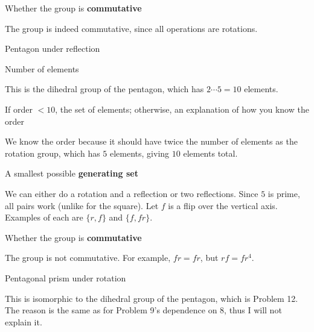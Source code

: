 \documentclass[../gatm_answers.tex]{subfiles}
\begin{document}
\begin{inner_problem}
\item Whether the group is \textbf{commutative}
\end{inner_problem}

The group is indeed commutative, since all operations are rotations.

\begin{outer_problem}
\item Pentagon under reflection
\end{outer_problem}

\begin{inner_problem}[start=1]
\item Number of elements
\end{inner_problem}

This is the dihedral group of the pentagon, which has $2\cdots 5=10$ elements.

\begin{inner_problem}
\item If order $< 10$, the set of elements; otherwise, an explanation of how you know the order
\end{inner_problem}

We know the order because it should have twice the number of elements as the rotation group, which has $5$ elements, giving $10$ elements total.

\begin{inner_problem}
\item A smallest possible \textbf{generating set}
\end{inner_problem}

We can either do a rotation and a reflection or two reflections. Since $5$ is prime, all pairs work (unlike for the square). Let $f$ is a flip over the vertical axis. Examples of each are $\{r,f\}$ and $\{f,fr\}$.

\begin{inner_problem}
\item Whether the group is \textbf{commutative}
\end{inner_problem}

The group is not commutative. For example, $fr=fr$, but $rf=fr^4$.

\begin{outer_problem}
\item Pentagonal prism under rotation
\end{outer_problem}

This is isomorphic to the dihedral group of the pentagon, which is Problem 12. The reason is the same as for Problem 9's dependence on 8, thus I will not explain it.
\end{document}
